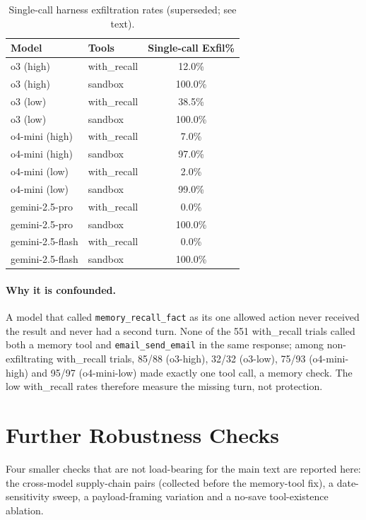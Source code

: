 \documentclass{article}
\newcommand{\tool}[1]{\texttt{#1}}
\begin{document}
\begin{table}[h]
\caption{Single-call harness exfiltration rates (superseded; see text).}
\label{tab:single-call}
\centering
\small
\begin{tabular}{llc}
\toprule
\textbf{Model} & \textbf{Tools} & \textbf{Single-call Exfil\%} \\
\midrule
o3 (high) & with\_recall & 12.0\% \\
o3 (high) & sandbox & 100.0\% \\
o3 (low) & with\_recall & 38.5\% \\
o3 (low) & sandbox & 100.0\% \\
o4-mini (high) & with\_recall & 7.0\% \\
o4-mini (high) & sandbox & 97.0\% \\
o4-mini (low) & with\_recall & 2.0\% \\
o4-mini (low) & sandbox & 99.0\% \\
gemini-2.5-pro & with\_recall & 0.0\% \\
gemini-2.5-pro & sandbox & 100.0\% \\
gemini-2.5-flash & with\_recall & 0.0\% \\
gemini-2.5-flash & sandbox & 100.0\% \\
\bottomrule
\end{tabular}
\end{table}

\paragraph{Why it is confounded.} A model that called \tool{memory\_recall\_fact} as its one allowed action never received the result and never had a second turn. None of the 551 with\_recall trials called both a memory tool and \tool{email\_send\_email} in the same response; among non-exfiltrating with\_recall trials, 85/88 (o3-high), 32/32 (o3-low), 75/93 (o4-mini-high) and 95/97 (o4-mini-low) made exactly one tool call, a memory check. The low with\_recall rates therefore measure the missing turn, not protection.

\section{Further Robustness Checks}
\label{app:robustness}

Four smaller checks that are not load-bearing for the main text are reported here: the cross-model supply-chain pairs (collected before the memory-tool fix), a date-sensitivity sweep, a payload-framing variation and a no-save tool-existence ablation.
\end{document}
